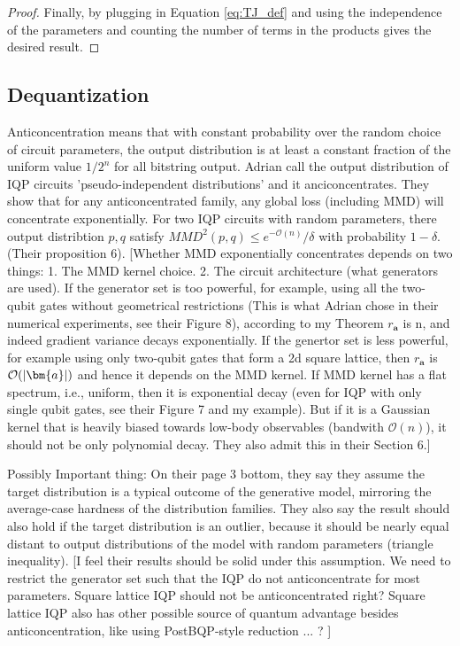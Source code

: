\documentclass[a4paper,onecolumn,notitlepage,nofootinbib,longbibliography,superscriptaddress, floatfix, pra, aps, 10pt]{revtex4-2}
\newcommand{\cmt}[1]{{\color{blue}[#1]}}
\newcommand{\vta}{{\bm{a}}}
\begin{document}
\begin{proof}
Finally, by plugging in Equation \ref{eq:TJ_def} and using the independence of the parameters and counting the number of terms in the products gives the desired result.
\end{proof}



\subsection{Dequantization}
Anticoncentration means that with constant probability over the random choice of circuit parameters, the output distribution is at least a constant fraction of the uniform value $1/2^n$ for all bitstring output. Adrian call the output distribution of IQP circuits 'pseudo-independent distributions' and it anciconcentrates. They show that for any anticoncentrated family, any global loss (including MMD) will concentrate exponentially. For two IQP circuits with random parameters, there output distribtion $p, q$ satisfy $MMD^2(p,q)\leq e^{-\mathcal{O}(n)}/\delta$ with probability $1-\delta$. (Their proposition 6). \cmt{Whether MMD exponentially concentrates depends on two things: 1. The MMD kernel choice. 2. The circuit architecture (what generators are used). If the generator set is too powerful, for example, using all the two-qubit gates without geometrical restrictions (This is what Adrian chose in their numerical experiments, see their Figure 8), according to my Theorem $r_\vta$ is n, and indeed gradient variance decays exponentially. If the genertor set is less powerful, for example using only two-qubit gates that form a 2d square lattice, then $r_\vta$ is $\mathcal{O}(\abs{\vta})$ and hence it depends on the MMD kernel. If MMD kernel has a flat spectrum, i.e., uniform, then it is exponential decay (even for IQP with only single qubit gates, see their Figure 7 and my example). But if it is a Gaussian kernel that is heavily biased towards low-body observables (bandwith $\mathcal{O}(n)$), it should not be only polynomial decay. They also admit this in their Section 6.}

Possibly Important thing: On their page 3 bottom, they say they assume the target distribution is a typical outcome of the generative model, mirroring the average-case hardness of the distribution families. They also say the result should also hold if the target distribution is an outlier, because it should be nearly equal distant to output distributions of the model with random parameters (triangle inequality). \cmt{I feel their results should be solid under this assumption. We need to restrict the generator set such that the IQP do not anticoncentrate for most parameters. Square lattice IQP should not be anticoncentrated right? Square lattice IQP also has other possible source of quantum advantage besides anticoncentration, like using PostBQP-style reduction ... ? }
\end{document}
